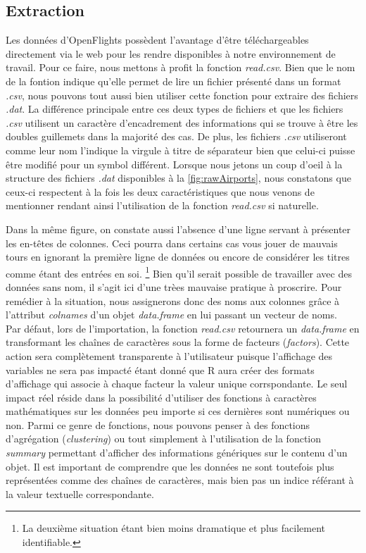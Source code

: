 \subsection{Extraction}
Les données d'OpenFlights possèdent l'avantage d'être téléchargeables directement via le web pour les rendre disponibles à notre environnement de travail. Pour ce faire, nous mettons à profit la fonction \emph{read.csv}. Bien que le nom de la fontion indique qu'elle permet de lire un fichier présenté dans un format \emph{.csv}, nous pouvons tout aussi bien utiliser cette fonction pour extraire des fichiers \emph{.dat}. La différence principale entre ces deux types de fichiers et que les fichiers \emph{.csv} utilisent un caractère d'encadrement des informations qui se trouve à être les doubles guillemets dans la majorité des cas. De plus, les fichiers \emph{.csv} utiliseront comme leur nom l'indique la virgule à titre de séparateur bien que celui-ci puisse être modifié pour un symbol différent.\cite{CSVDAT} Lorsque nous jetons un coup d'oeil à la structure des fichiers \emph{.dat} disponibles à la \autoref{fig:rawAirports}, nous constatons que ceux-ci respectent à la fois les deux caractéristiques que nous venons de mentionner rendant ainsi l'utilisation de la fonction \emph{read.csv} si naturelle. \\


\noindent
Dans la même figure, on constate aussi l'absence d'une ligne servant à présenter les en-têtes de colonnes. Ceci pourra dans certains cas vous jouer de mauvais tours en ignorant la première ligne de données ou encore de considérer les titres comme étant des entrées en soi. \footnote{La deuxième situation étant bien moins dramatique et plus facilement identifiable.}  Bien qu'il serait possible de travailler avec des données sans nom, il s'agit ici d'une trèes mauvaise pratique à proscrire. Pour remédier à la situation, nous assignerons donc des noms aux colonnes grâce à l'attribut \emph{colnames} d'un objet \emph{data.frame} en lui passant un vecteur de noms.\\

\noindent
Par défaut, lors de l'importation, la fonction \emph{read.csv} retournera un \emph{data.frame} en transformant les chaînes de caractères sous la forme de facteurs (\emph{factors}). Cette action sera complètement transparente à l'utilisateur puisque l'affichage des variables ne sera pas impacté étant donné que R aura créer des formats d'affichage qui associe à chaque facteur la valeur unique corrspondante. Le seul impact réel réside dans la possibilité d'utiliser des fonctions à caractères mathématiques sur les données peu importe si ces dernières sont numériques ou non. Parmi ce genre de fonctions, nous pouvons penser à des fonctions d'agrégation (\emph{clustering}) ou tout simplement à l'utilisation de la fonction \emph{summary} permettant d'afficher des informations génériques sur le contenu d'un objet. Il est important de comprendre que les données ne sont toutefois plus représentées comme des chaînes de caractères, mais bien pas un indice référant à la valeur textuelle correspondante. \\

